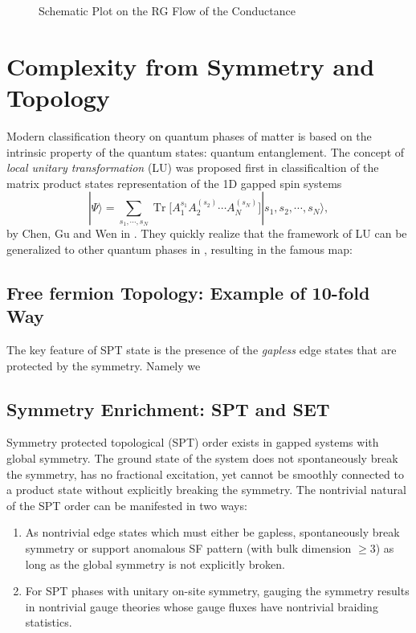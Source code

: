 \begin{itemize}
\begin{figure}[!htp]
              \caption{Schematic Plot on the RG Flow of the Conductance}
              \label{fig:scaling_of_Anderson_localization}
          \end{figure}
\end{itemize}

\section{Complexity from Symmetry and Topology}
Modern classification theory on quantum phases of matter is based on the intrinsic property of the quantum states: quantum entanglement. The concept of \emph{local unitary transformation} (LU) was proposed first in classificaltion of the matrix product states representation of the 1D gapped spin systems
\begin{equation*}
    |\Psi\rangle=\sum_{s_1,\cdots,s_N}\mathop{\mathrm{Tr}}\bigg[A_1^{s_1}A_2^{(s_2)}\cdots A_N^{(s_N)}\bigg]|s_1,s_2,\cdots,s_N\rangle,
\end{equation*}
by Chen, Gu and Wen in \cite{chen2011classification} . They quickly realize that the framework of LU can be generalized to other quantum phases in \cite{chen2010local}, resulting in the famous map:

\subsection{Free fermion Topology: Example of 10-fold Way}
The key feature of SPT state is the presence of the \emph{gapless} edge states that are protected by the symmetry. Namely we


\subsection{Symmetry Enrichment: SPT and SET}
Symmetry protected topological (SPT) order exists in gapped systems with global symmetry. The ground state of the system does not spontaneously break the symmetry, has no fractional excitation, yet cannot be smoothly connected to a product state without explicitly breaking the symmetry. The nontrivial natural of the SPT order can be manifested in two ways:
\begin{enumerate}
    \item As nontrivial edge states which must either be gapless, spontaneously break symmetry or support anomalous SF pattern (with bulk dimension $\geq3$) as long as the global symmetry is not explicitly broken.
    \item For SPT phases with unitary on-site symmetry, gauging the symmetry results in nontrivial gauge theories whose gauge fluxes have nontrivial braiding statistics.
\end{enumerate}

